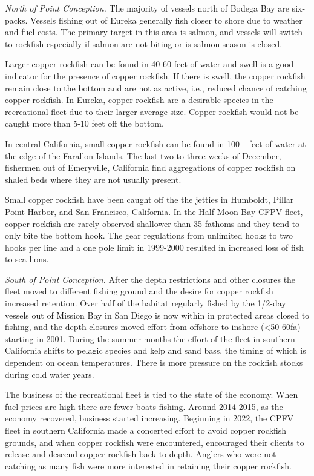 \documentclass[11pt,
  english,
  letterpaper,
]{article}
\begin{document}
\emph{North of Point Conception.} The majority of vessels north of Bodega Bay are six-packs. Vessels fishing out of Eureka generally fish closer to shore due to weather and fuel costs. The primary target in this area is salmon, and vessels will switch to rockfish especially if salmon are not biting or is salmon season is closed.

Larger copper rockfish can be found in 40-60 feet of water and swell is a good indicator for the presence of copper rockfish. If there is swell, the copper rockfish remain close to the bottom and are not as active, i.e., reduced chance of catching copper rockfish. In Eureka, copper rockfish are a desirable species in the recreational fleet due to their larger average size. Copper rockfish would not be caught more than 5-10 feet off the bottom.

In central California, small copper rockfish can be found in 100+ feet of water at the edge of the Farallon Islands. The last two to three weeks of December, fishermen out of Emeryville, California find aggregations of copper rockfish on shaled beds where they are not usually present.

Small copper rockfish have been caught off the the jetties in Humboldt, Pillar Point Harbor, and San Francisco, California. In the Half Moon Bay CFPV fleet, copper rockfish are rarely observed shallower than 35 fathoms and they tend to only bite the bottom hook. The gear regulations from unlimited hooks to two hooks per line and a one pole limit in 1999-2000 resulted in increased loss of fish to sea lions.

\emph{South of Point Conception.} After the depth restrictions and other closures the fleet moved to different fishing ground and the desire for copper rockfish increased retention. Over half of the habitat regularly fished by the 1/2-day vessels out of Mission Bay in San Diego is now within in protected areas closed to fishing, and the depth closures moved effort from offshore to inshore (\textless50-60fa) starting in 2001. During the summer months the effort of the fleet in southern California shifts to pelagic species and kelp and sand bass, the timing of which is dependent on ocean temperatures. There is more pressure on the rockfish stocks during cold water years.

The business of the recreational fleet is tied to the state of the economy. When fuel prices are high there are fewer boats fishing. Around 2014-2015, as the economy recovered, business started increasing. Beginning in 2022, the CPFV fleet in southern California made a concerted effort to avoid copper rockfish grounds, and when copper rockfish were encountered, encouraged their clients to release and descend copper rockfish back to depth. Anglers who were not catching as many fish were more interested in retaining their copper rockfish.
\end{document}
